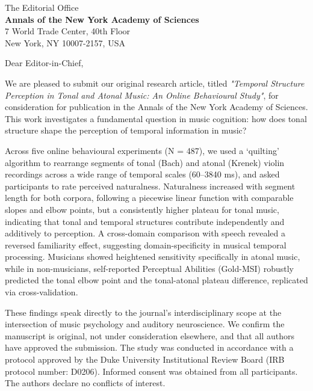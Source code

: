 \documentclass[11pt, a4paper]{letter}
\begin{document}

\begin{flushleft}
  \small
  The Editorial Office \\
  \textbf{Annals of the New York Academy of Sciences}\\
  7 World Trade Center, 40th Floor \\
  New York, NY 10007-2157, USA
  \vspace{1em}
\end{flushleft}


Dear Editor-in-Chief,
\vspace{0.5em}

We are pleased to submit our original research article, titled \emph{"Temporal Structure Perception in Tonal and Atonal Music: An Online Behavioural Study"}, for consideration for publication in the Annals of the New York Academy of Sciences.  This work investigates a fundamental question in music cognition: how does tonal structure shape the perception of temporal information in music? 

Across five online behavioural experiments (N = 487), we used a `quilting' algorithm to rearrange segments of tonal (Bach) and atonal (Krenek) violin recordings across a wide range of temporal scales (60--3840 ms), and asked participants to rate perceived naturalness. Naturalness increased with segment length for both corpora, following a piecewise linear function with comparable slopes and elbow points, but a consistently higher plateau for tonal music, indicating that tonal and temporal structures contribute independently and additively to perception. A cross-domain comparison with speech revealed a reversed familiarity effect, suggesting domain-specificity in musical temporal processing. Musicians showed heightened sensitivity specifically in atonal music, while in non-musicians, self-reported Perceptual Abilities (Gold-MSI) robustly predicted the tonal elbow point and the tonal-atonal plateau difference, replicated via cross-validation.

These findings speak directly to the journal's interdisciplinary scope at the intersection of music psychology and auditory neuroscience. We confirm the manuscript is original, not under consideration elsewhere, and that all authors have approved the submission. The study was conducted in accordance with a protocol approved by the Duke University Institutional Review Board (IRB protocol number: D0206). Informed consent was obtained from all participants. The authors declare no conflicts of interest.
\end{document}
